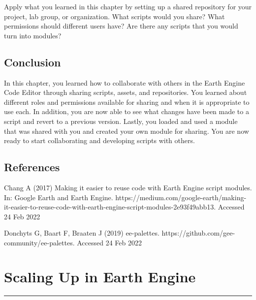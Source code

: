 \documentclass[
  letterpaper,
  DIV=11,
  numbers=noendperiod]{scrreprt}
\begin{document}

Apply what you learned in this chapter by setting up a shared repository
for your project, lab group, or organization. What scripts would you
share? What permissions should different users have? Are there any
scripts that you would turn into modules?

\hypertarget{conclusion-22}{%
\section*{Conclusion}\label{conclusion-22}}


In this chapter, you learned how to collaborate with others in the Earth
Engine Code Editor through sharing scripts, assets, and repositories.
You learned about different roles and permissions available for sharing
and when it is appropriate to use each. In addition, you are now able to
see what changes have been made to a script and revert to a previous
version. Lastly, you loaded and used a module that was shared with you
and created your own module for sharing. You are now ready to start
collaborating and developing scripts with others.

\hypertarget{references-15}{%
\section*{References}\label{references-15}}


Chang A (2017) Making it easier to reuse code with Earth Engine script
modules. In: Google Earth and Earth Engine.
https://medium.com/google-earth/making-it-easier-to-reuse-code-with-earth-engine-script-modules-2e93f49abb13.
Accessed 24 Feb 2022

Donchyts G, Baart F, Braaten J (2019) ee-palettes.
https://github.com/gee-community/ee-palettes. Accessed 24 Feb 2022

\hypertarget{scaling-up-in-earth-engine}{%
\chapter{Scaling Up in Earth Engine}\label{scaling-up-in-earth-engine}}

\begin{center}\rule{0.5\linewidth}{0.5pt}\end{center}
\end{document}
